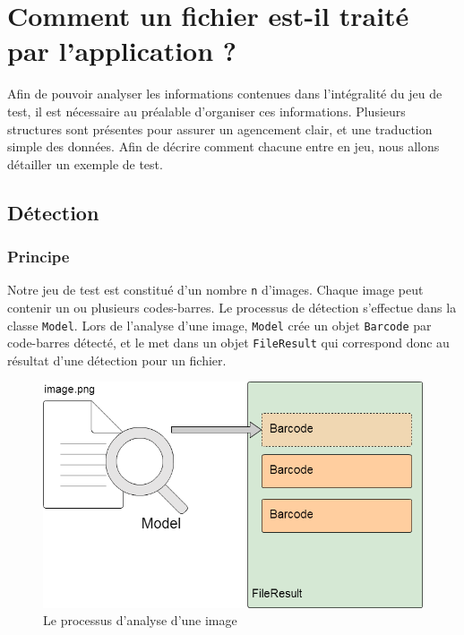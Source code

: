\chapter{Comment un fichier est-il traité par l'application ?}

Afin de pouvoir analyser les informations contenues dans l'intégralité du jeu de test, il est nécessaire au préalable d'organiser ces informations. Plusieurs structures sont présentes pour assurer un agencement clair, et une traduction simple des données. Afin de décrire comment chacune entre en jeu, nous allons détailler un exemple de test.

\section{Détection}

\subsection{Principe}

Notre jeu de test est constitué d'un nombre \verb|n| d'images. Chaque image peut contenir un ou plusieurs codes-barres. Le processus de détection s'effectue dans la classe \verb|Model|. Lors de l'analyse d'une image, \verb|Model| crée un objet \verb|Barcode| par code-barres détecté, et le met dans un objet \verb|FileResult| qui correspond donc au résultat d'une détection pour un fichier.

\begin{figure}
\begin{center}
\includegraphics[scale=0.3]{images/projet1Detection.png}
\caption{Le processus d'analyse d'une image}
\end{center}
\end{figure}

